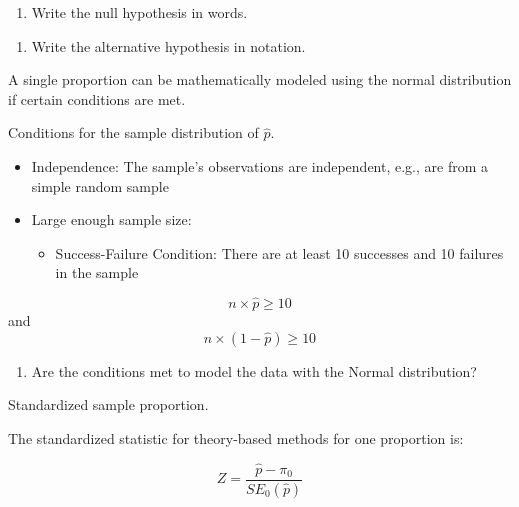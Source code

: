 \documentclass[
]{report}
\providecommand{\tightlist}{%
  \setlength{\itemsep}{0pt}\setlength{\parskip}{0pt}}
\begin{document}
\vspace{0.3in}

\begin{enumerate}
\def\labelenumi{\arabic{enumi}.}
\setcounter{enumi}{2}
\tightlist
\item
  Write the null hypothesis in words.
\end{enumerate}

\vspace{0.6in}

\begin{enumerate}
\def\labelenumi{\arabic{enumi}.}
\setcounter{enumi}{3}
\tightlist
\item
  Write the alternative hypothesis in notation.
\end{enumerate}

\vspace{0.2in}

A single proportion can be mathematically modeled using the normal distribution if certain conditions are met.

Conditions for the sample distribution of \(\hat{p}\).

\begin{itemize}
\item
  Independence: The sample's observations are independent, e.g., are from a simple random sample
\item
  Large enough sample size:

  \begin{itemize}
  \tightlist
  \item
    Success-Failure Condition: There are at least 10 successes and 10 failures in the sample
  \end{itemize}
\end{itemize}

\[n \times \hat{p} \ge 10\] and \[n \times (1-\hat{p}) \ge 10\]

\begin{enumerate}
\def\labelenumi{\arabic{enumi}.}
\setcounter{enumi}{4}
\tightlist
\item
  Are the conditions met to model the data with the Normal distribution?
\end{enumerate}

\vspace{0.6in}

Standardized sample proportion.

The standardized statistic for theory-based methods for one proportion is:

\[Z = \frac{\hat{p}-\pi_0}{SE_0(\hat{p})}\]
\end{document}
